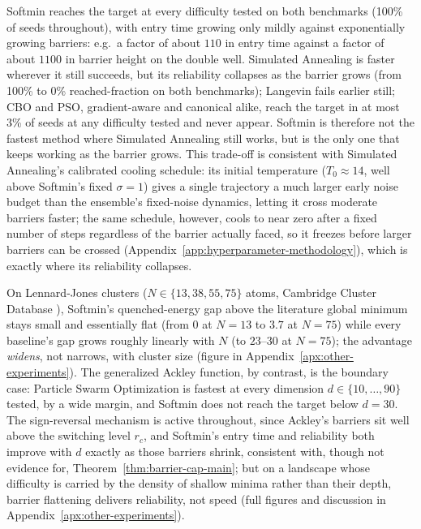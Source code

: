 \documentclass{opt2026} %
\begin{document}
Softmin reaches the target at every difficulty tested on both benchmarks (100\% of seeds throughout), with entry time growing only mildly against exponentially growing barriers: e.g.\ a factor of about $110$ in entry time against a factor of about $1100$ in barrier height on the double well. Simulated Annealing is faster wherever it still succeeds, but its reliability collapses as the barrier grows (from 100\% to 0\% reached-fraction on both benchmarks); Langevin fails earlier still; CBO and PSO, gradient-aware and canonical alike, reach the target in at most 3\% of seeds at any difficulty tested and never appear. Softmin is therefore not the fastest method where Simulated Annealing still works, but is the only one that keeps working as the barrier grows. This trade-off is consistent with Simulated Annealing's calibrated cooling schedule: its initial temperature ($T_0\approx14$, well above Softmin's fixed $\sigma=1$) gives a single trajectory a much larger early noise budget than the ensemble's fixed-noise dynamics, letting it cross moderate barriers faster; the same schedule, however, cools to near zero after a fixed number of steps regardless of the barrier actually faced, so it freezes before larger barriers can be crossed (Appendix~\ref{app:hyperparameter-methodology}), which is exactly where its reliability collapses.

On Lennard-Jones clusters ($N\in\{13,38,55,75\}$ atoms, Cambridge Cluster Database \citep{wales1997global,jones1924determination}), Softmin's quenched-energy gap above the literature global minimum stays small and essentially flat (from $0$ at $N=13$ to $3.7$ at $N=75$) while every baseline's gap grows roughly linearly with $N$ (to $23$--$30$ at $N=75$); the advantage \emph{widens}, not narrows, with cluster size (figure in Appendix~\ref{apx:other-experiments}). The generalized Ackley function, by contrast, is the boundary case: Particle Swarm Optimization is fastest at every dimension $d\in\{10,\dots,90\}$ tested, by a wide margin, and Softmin does not reach the target below $d=30$. The sign-reversal mechanism is active throughout, since Ackley's barriers sit well above the switching level $r_c$, and Softmin's entry time and reliability both improve with $d$ exactly as those barriers shrink, consistent with, though not evidence for, Theorem~\ref{thm:barrier-cap-main}; but on a landscape whose difficulty is carried by the density of shallow minima rather than their depth, barrier flattening delivers reliability, not speed (full figures and discussion in Appendix~\ref{apx:other-experiments}).
\end{document}
